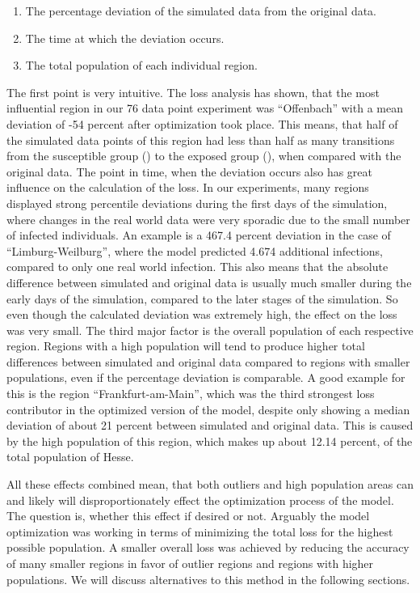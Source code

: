 \begin{enumerate}[label=\arabic*.]
	\item The percentage deviation of the simulated data from the original data.
	\item The time at which the deviation occurs.
	\item The total population of each individual region.
\end{enumerate}

The first point is very intuitive. The loss analysis has shown, that the most influential region in our 76 data point experiment was ``Offenbach'' with
a mean deviation of -54 percent after optimization took place. This means, that half of the simulated data points of this region
had less than half as many transitions from the susceptible group () to the exposed group (), when compared with 
the original data.
The point in time, when the deviation occurs also has great influence on the calculation of the loss. In our experiments, many regions
displayed strong percentile deviations during the first days of the simulation, where changes in the real world data were very
sporadic due to the small number of infected individuals. An example is a 467.4 percent deviation
in the case of ``Limburg-Weilburg'', where the model predicted 4.674 additional infections, compared to only one real world infection.
This also means that the absolute difference between simulated and original data is usually much
smaller during the early days of the simulation, compared to the later stages of the simulation. So even though the
calculated deviation was extremely high, the effect on the loss was very small.
The third major factor is the overall population of each respective region. Regions with a high population will tend to
produce higher total differences between simulated and original data compared to regions with smaller populations, even if the percentage
deviation is comparable.  A good example for this
is the region ``Frankfurt-am-Main'', which was the third strongest loss contributor in the optimized version of the model, despite
only showing a median deviation of about 21 percent between simulated and original data. This is caused by the high population of
this region, which makes up about 12.14 percent, of the total population of Hesse.\newline

All these effects combined mean, that both outliers and high population areas can and likely will disproportionately effect the
optimization process of the model. The question is, whether this effect if desired or not. Arguably the model optimization was
working in terms of minimizing the total loss for the highest possible population. A smaller overall loss was achieved by
reducing the accuracy of many smaller regions in favor of outlier regions and regions with higher populations. We will discuss alternatives to this method in the
following sections.

